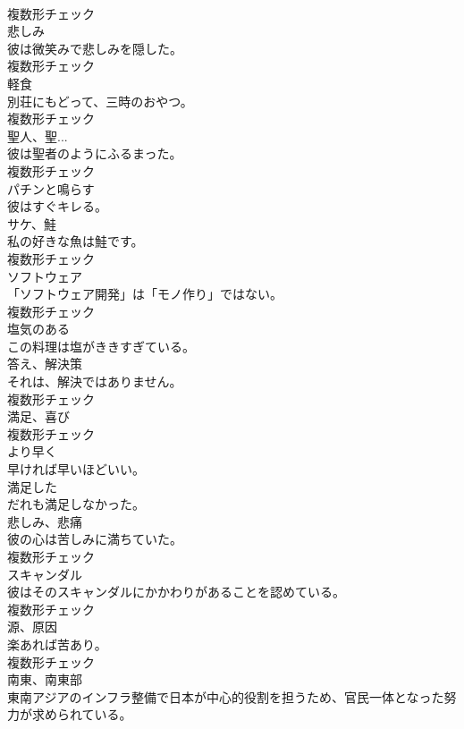 \documentclass[8pt]{extreport}
\begin{document}
\begin{CJK}{UTF8}{min}
\\	複数形チェック
\\	[名詞]	悲しみ	
\\	彼は微笑みで悲しみを隠した。	
\\	複数形チェック
\\	[名詞]	軽食	
\\	別荘にもどって、三時のおやつ。	
\\	複数形チェック
\\	[名詞]	聖人、聖...	
\\	彼は聖者のようにふるまった。	
\\	複数形チェック
\\	[動詞]	パチンと鳴らす	
\\	彼はすぐキレる。	
\\	[名詞]	サケ、鮭	
\\	私の好きな魚は鮭です。	
\\	複数形チェック
\\	[名詞]	ソフトウェア	
\\	「ソフトウェア開発」は「モノ作り」ではない。	
\\	複数形チェック
\\	[形容詞]	塩気のある	
\\	この料理は塩がききすぎている。	
\\	[名詞]	答え、解決策	
\\	それは、解決ではありません。	
\\	複数形チェック
\\	[名詞]	満足、喜び	
\\	複数形チェック
\\	[副詞]	より早く	
\\	早ければ早いほどいい。	
\\	[形容詞]	満足した	
\\	だれも満足しなかった。	
\\	[名詞]	悲しみ、悲痛	
\\	彼の心は苦しみに満ちていた。	
\\	複数形チェック
\\	[名詞]	スキャンダル	
\\	彼はそのスキャンダルにかかわりがあることを認めている。	
\\	複数形チェック
\\	[名詞]	源、原因	
\\	楽あれば苦あり。	
\\	複数形チェック
\\	[名詞]	南東、南東部	
\\	東南アジアのインフラ整備で日本が中心的役割を担うため、官民一体となった努力が求められている。	

\end{CJK}
\end{document}
